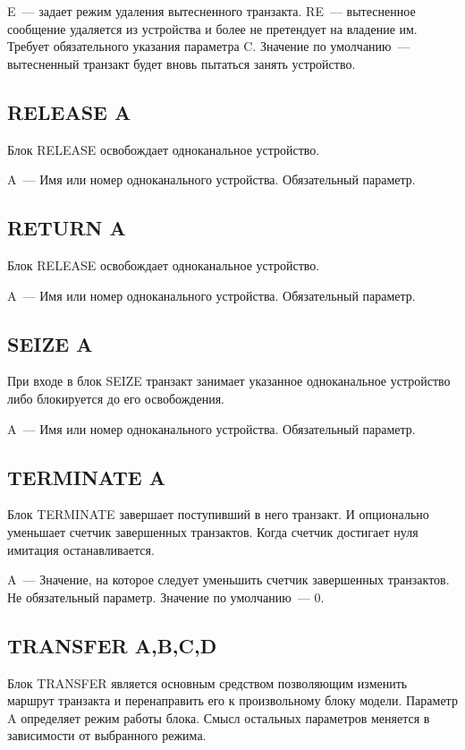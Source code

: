 E~--- задает режим удаления вытесненного транзакта. RE~--- вытесненное сообщение удаляется из устройства и более не претендует на владение им. Требует обязательного указания параметра C. Значение по умолчанию~--- вытесненный транзакт будет вновь пытаться занять устройство. 

\subsection*{RELEASE A}

Блок RELEASE освобождает одноканальное устройство.

A~--- Имя или номер одноканального устройства. Обязательный параметр.

\subsection*{RETURN A}

Блок RELEASE освобождает одноканальное устройство.

A~--- Имя или номер одноканального устройства. Обязательный параметр.

\subsection*{SEIZE A}

При входе в блок SEIZE транзакт занимает указанное одноканальное устройство либо блокируется до его освобождения.

A~--- Имя или номер одноканального устройства. Обязательный параметр.

\subsection*{TERMINATE A}

Блок TERMINATE завершает поступивший в него транзакт. И опционально уменьшает счетчик завершенных транзактов. Когда счетчик достигает нуля имитация останавливается.

A~--- Значение, на которое следует уменьшить счетчик завершенных транзактов. Не обязательный параметр. Значение по умолчанию~--- 0.

\subsection*{TRANSFER A,B,C,D}

Блок TRANSFER является основным средством позволяющим изменить маршрут транзакта и перенаправить его к произвольному блоку модели. Параметр A определяет режим работы блока. Смысл остальных параметров меняется в зависимости от выбранного режима.


